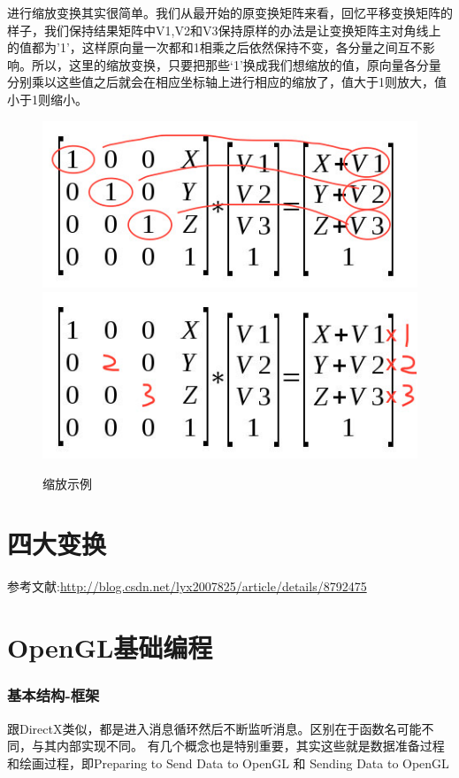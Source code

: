 \documentclass[UTF8,a4paper,8pt]{ctexbook}
\begin{document}
		进行缩放变换其实很简单。我们从最开始的原变换矩阵来看，回忆平移变换矩阵的样子，我们保持结果矩阵中V1,V2和V3保持原样的办法是让变换矩阵主对角线上的值都为’1’，这样原向量一次都和1相乘之后依然保持不变，各分量之间互不影响。所以，这里的缩放变换，只要把那些‘1’换成我们想缩放的值，原向量各分量分别乘以这些值之后就会在相应坐标轴上进行相应的缩放了，值大于1则放大，值小于1则缩小。
		
		\begin{figure}[h]
			\centering
			\includegraphics[scale = 0.57]{scale_1.png}
			\includegraphics[scale = 0.57]{scale_2.png}
			\caption{缩放示例}
		\end{figure}

\chapter{四大变换}
参考文献:\url{http://blog.csdn.net/lyx2007825/article/details/8792475}



   
\chapter{OpenGL基础编程}
	
	\subsection{基本结构-框架}
		跟DirectX类似，都是进入消息循环然后不断监听消息。区别在于函数名可能不同，与其内部实现不同。
		有几个概念也是特别重要，其实这些就是数据准备过程和绘画过程，即Preparing to Send Data to OpenGL 和 Sending Data to OpenGL
		
\end{document}
